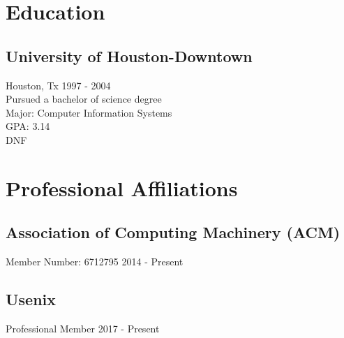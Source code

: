 \documentclass{article}
\begin{document}
  
\section{Education}
  \subsection{University of Houston-Downtown}
    Houston, Tx \hfill 1997 - 2004\\
    Pursued a bachelor of science degree\\
    Major: Computer Information Systems\\
    GPA: 3.14\\
    DNF\\
    

\section{Professional Affiliations}
  \subsection{Association of Computing Machinery (ACM)}
    Member Number: 6712795 \hfill 2014 - Present
  \subsection{Usenix}
    Professional Member \hfill 2017 - Present
\end{document}
